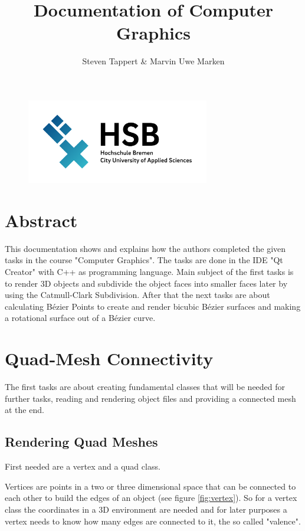 \documentclass[11.5pt,oneside,a4paper]{scrartcl}
\title{Documentation of Computer Graphics}
\author{Steven Tappert \& Marvin Uwe Marken}
\date{}
\newcounter{ct}
\begin{document}
\clearpage
{\let\newpage\relax\maketitle}
\thispagestyle{empty}
\vspace{20pt}

\begin{figure}
	\centering
	\includegraphics[width=8cm]{hsb.png} \\
\end{figure}

\newpage
\tableofcontents
\newpage

\section{Abstract}
This documentation shows and explains how the authors completed the given tasks in the course "Computer Graphics". The tasks are done in the IDE "Qt Creator" with C++ as programming language. Main subject of the first tasks is to render 3D objects and subdivide the object faces into smaller faces later by using the Catmull-Clark Subdivision. After that the next tasks are about calculating Bézier Points to create and render bicubic Bézier surfaces and making a rotational surface out of a Bézier curve.

\section{Quad-Mesh Connectivity}

The first tasks are about creating fundamental classes that will be needed for further tasks, reading and rendering object files and providing a connected mesh at the end.


\subsection{Rendering Quad Meshes}

First needed are a vertex and a quad class.

Vertices are points in a two or three dimensional space that can be connected to each other to build the edges of an object (see figure \ref{fig:vertex}). So for a vertex class the coordinates in a 3D environment are needed and for later purposes a vertex needs to know how many edges are connected to it, the so called "valence".
\end{document}
